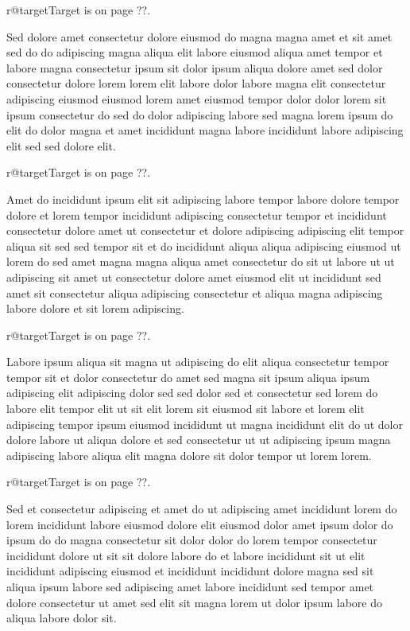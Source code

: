\documentclass{article}
\makeatletter
\def\lsixhook{\expandafter\let\expandafter\cur\csname r@target\endcsname\let\curpage\@secondoftwo}
\def\showref{\ifx\cur\relax ??\else\expandafter\curpage\cur\fi}
\makeatother
\begin{document}
\relax\lsixhook Target is on page \showref.

Sed dolore amet consectetur dolore eiusmod do magna magna amet et sit amet sed do do adipiscing magna aliqua elit labore eiusmod aliqua amet tempor et labore magna consectetur ipsum sit dolor ipsum aliqua dolore amet sed dolor consectetur dolore lorem lorem elit labore dolor labore magna elit consectetur adipiscing eiusmod eiusmod lorem amet eiusmod tempor dolor dolor lorem sit ipsum consectetur do sed do dolor adipiscing labore sed magna lorem ipsum do elit do dolor magna et amet incididunt magna labore incididunt labore adipiscing elit sed sed dolore elit.

\relax\lsixhook Target is on page \showref.

Amet do incididunt ipsum elit sit adipiscing labore tempor labore dolore tempor dolore et lorem tempor incididunt adipiscing consectetur tempor et incididunt consectetur dolore amet ut consectetur et dolore adipiscing adipiscing elit tempor aliqua sit sed sed tempor sit et do incididunt aliqua aliqua adipiscing eiusmod ut lorem do sed amet magna magna aliqua amet consectetur do sit ut labore ut ut adipiscing sit amet ut consectetur dolore amet eiusmod elit ut incididunt sed amet sit consectetur aliqua adipiscing consectetur et aliqua magna adipiscing labore dolore et sit lorem adipiscing.

\relax\lsixhook Target is on page \showref.

Labore ipsum aliqua sit magna ut adipiscing do elit aliqua consectetur tempor tempor sit et dolor consectetur do amet sed magna sit ipsum aliqua ipsum adipiscing elit adipiscing dolor sed sed dolor sed et consectetur sed lorem do labore elit tempor elit ut sit elit lorem sit eiusmod sit labore et lorem elit adipiscing tempor ipsum eiusmod incididunt ut magna incididunt elit do ut dolor dolore labore ut aliqua dolore et sed consectetur ut ut adipiscing ipsum magna adipiscing labore aliqua elit magna dolore sit dolor tempor ut lorem lorem.

\relax\lsixhook Target is on page \showref.

Sed et consectetur adipiscing et amet do ut adipiscing amet incididunt lorem do lorem incididunt labore eiusmod dolore elit eiusmod dolor amet ipsum dolor do ipsum do do magna consectetur sit dolor dolor do lorem tempor consectetur incididunt dolore ut sit sit dolore labore do et labore incididunt sit ut elit incididunt adipiscing eiusmod et incididunt incididunt dolore magna sed sit aliqua ipsum labore sed adipiscing amet labore incididunt sed tempor amet dolore consectetur ut amet sed elit sit magna lorem ut dolor ipsum labore do aliqua labore dolor sit.
\end{document}

